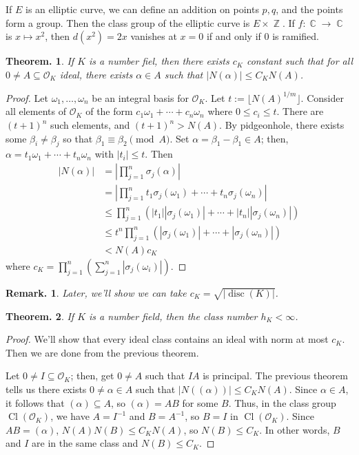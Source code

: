 \documentclass[11pt, a4paper]{memoir}
\DeclareMathOperator{\Z}{{\mathbb{Z}}}
\DeclareMathOperator{\C}{{\mathbb{C}}}
\theoremstyle{change}
\newtheorem{theorem}{Theorem.}[section]
\theoremstyle{plain}
\theoremstyle{nonumberplain}
\newtheorem{remark}{Remark.}
\newtheorem{proof}{Proof}
\DeclareMathOperator{\disc}{disc}
\DeclareMathOperator{\Cl}{Cl}
\numberwithin{equation}{section}
\begin{document}
If $E$ is an elliptic curve, we can define an addition on points $p,q$, and the points form a group.
Then the class group of the elliptic curve is $E\times\Z$.
If $f:\C\to\C$ is $x\mapsto x^2$, then $d(x^2)=2x$ vanishes at $x=0$ if and only if $0$ is ramified.
\begin{theorem}
    If $K$ is a number fiel, then there exists $c_K$ constant such that for all $0\neq A\subseteq\mathcal{O}_K$ ideal, there exists $\alpha\in A$ such that $|N(\alpha)|\leq C_KN(A)$.
\end{theorem}
\begin{proof}
    Let $\omega_1,\ldots,\omega_n$ be an integral basis for $\mathcal{O}_K$.
    Let $t:=\lfloor N(A)^{1/m}\rfloor$.
    Consider all elements of $\mathcal{O}_K$ of the form $c_1\omega_1+\cdots+c_n\omega_n$ where $0\leq c_i\leq t$.
    There are $(t+1)^n$ such elements, and $(t+1)^n>N(A)$.
    By pidgeonhole, there exists some $\beta_i\neq\beta_j$ so that $\beta_1\equiv\beta_2\pmod{A}$.
    Set $\alpha=\beta_1-\beta_1\in A$; then, $\alpha=t_1\omega_1+\cdots+t_n\omega_n$ with $|t_i|\leq t$.
    Then
    \begin{align*}
        |N(\alpha)| &= \left\lvert\prod_{j=1}^n\sigma_j(\alpha)\right\rvert\\
                    &= \left\lvert\prod_{j=1}^nt_1\sigma_j(\omega_1)+\cdots+t_n\sigma_j(\omega_n)\right\rvert\\
                    &\leq \prod_{j=1}^n\left(|t_1||\sigma_j(\omega_1)|+\cdots+|t_n||\sigma_j(\omega_n)|\right)\\
                    &\leq t^n\prod_{j=1}^n(|\sigma_j(\omega_1)|+\cdots+|\sigma_j(\omega_n)|)\\
                    &<N(A)c_K
    \end{align*}
    where $c_K=\prod_{j=1}^n\left(\sum_{j=1}^n|\sigma_j(\omega_i)|\right)$.
\end{proof}
\begin{remark}
    Later, we'll show we can take $c_K=\sqrt{|\disc(K)|}$.
\end{remark}
\begin{theorem}
    If $K$ is a number field, then the class number $h_K<\infty$.
\end{theorem}
\begin{proof}
    We'll show that every ideal class contains an ideal with norm at most $c_K$.
    Then we are done from the previous theorem.

    Let $0\neq I\subseteq\mathcal{O}_K$; then, get $0\neq A$ such that $IA$ is principal.
    The previous theorem tells us there exists $0\neq\alpha\in A$ such that $|N((\alpha))|\leq C_KN(A)$.
    Since $\alpha\in A$, it follows that $(\alpha)\subseteq A$, so $(\alpha)=AB$ for some $B$.
    Thus, in the class group $\Cl(\mathcal{O}_K)$, we have $A=I^{-1}$ and $B=A^{-1}$, so $B=I$ in $\Cl(\mathcal{O}_K)$.
    Since $AB=(\alpha)$, $N(A)N(B)\leq C_KN(A)$, so $N(B)\leq C_K$.
    In other words, $B$ and $I$ are in the same class and $N(B)\leq C_K$.
\end{proof}
\end{document}
